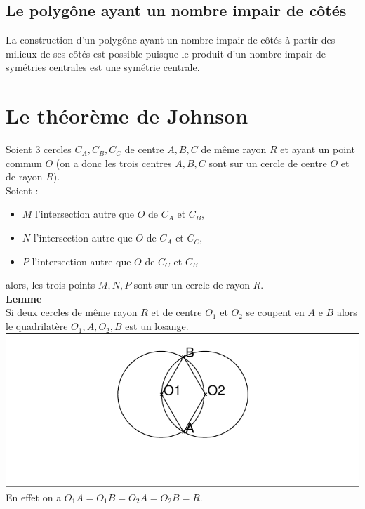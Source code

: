 \documentclass[a4paper,11pt]{book}
\begin{document}
\subsection{Le polyg\^one ayant un nombre impair de c\^ot\'es}
La construction d'un polyg\^one ayant un nombre impair de c\^ot\'es \`a partir 
des milieux de ses c\^ot\'es est possible puisque le produit d'un nombre impair
de sym\'etries centrales est une sym\'etrie centrale.

\section{Le th\'eor\`eme de Johnson}
Soient 3 cercles $C_A,C_B,C_C$ de centre $A,B,C$ de m\^eme rayon $R$ 
et ayant un point commun $O$ (on a donc les trois centres $A,B,C$
sont sur un cercle de centre $O$ et de rayon $R$).\\
Soient :
\begin{itemize}
\item $M$ l'intersection autre que $O$ de $C_A$ et $C_B$,
\item $N$ l'intersection autre que $O$ de $C_A$ et $C_C$,  
\item $P$ l'intersection autre que $O$ de $C_C$ et $C_B$ 
\end{itemize}
alors, les trois points 
$M,N,P$ sont sur un cercle de rayon $R$.\\ 

{\bf Lemme}\\
Si deux cercles de m\^eme rayon $R$ et de centre $O_1$ et $O_2$ se coupent en 
$A$ e $B$ alors le quadrilat\`ere $O_1,A,O_2,B$ est un losange.\\

\includegraphics[width=\textwidth]{casjohn0}\\
En effet on a $O_1A=O_1B=O_2A=O_2B=R$.\\
\end{document}
